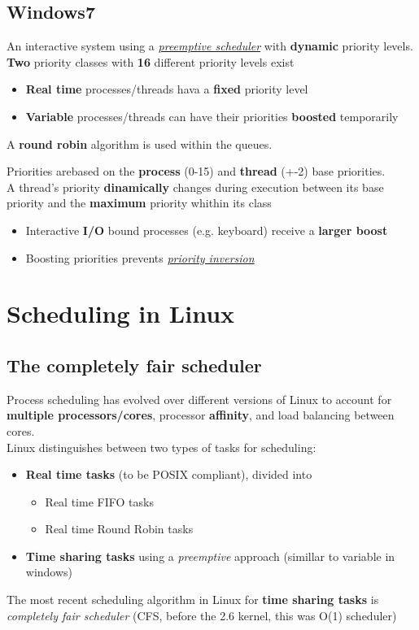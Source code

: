 \documentclass{article}
\newcommand{\worddef}[1]{\hyperref[sec:reference]{\textit{#1}}}
\begin{document}
\subsection{Windows7}
\begin{flushleft}
An interactive system using a \worddef{preemptive scheduler} with \textbf{dynamic} priority levels. \textbf{Two} priority classes with \textbf{16} different priority levels exist
\begin{itemize}
	\item \textbf{Real time} processes/threads hava a \textbf{fixed} priority level
	\item \textbf{Variable} processes/threads can have their priorities \textbf{boosted} temporarily
\end{itemize}
A \textbf{round robin} algorithm is used within the queues.
\smallskip

Priorities arebased on the \textbf{process} (0-15) and \textbf{thread} (+-2) base priorities.\\
A thread's priority \textbf{dinamically} changes during execution between its base priority and the \textbf{maximum} priority whithin its class
\begin{itemize}
	\item Interactive \textbf{I/O} bound processes (e.g. keyboard) receive a \textbf{larger boost}
	\item Boosting priorities prevents \hyperref[sec:reference]{\textit{priority inversion}}
\end{itemize}
\end{flushleft}

\section{Scheduling in Linux}

\subsection{The completely fair scheduler}
\begin{flushleft}
Process scheduling has evolved over different versions of Linux to account for \textbf{multiple processors/cores}, processor \textbf{affinity}, and load balancing between cores.\\
Linux distinguishes between two types of tasks for scheduling:
\begin{itemize}
	\item \textbf{Real time tasks} (to be POSIX compliant), divided into
	\begin{itemize}
		\item Real time FIFO tasks
		\item Real time Round Robin tasks
	\end{itemize}
	\item \textbf{Time sharing tasks} using a \textit{preemptive} approach (simillar to variable in windows)
\end{itemize}
The most recent scheduling algorithm in Linux for \textbf{time sharing tasks} is \textit{completely fair scheduler} (CFS, before the 2.6 kernel, this was O(1) scheduler)
\end{flushleft}
\end{document}
